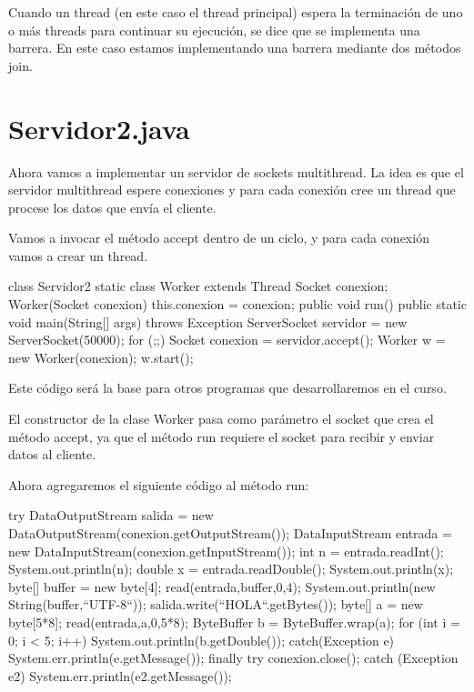 Cuando un thread (en este caso el thread principal) espera la terminación de uno o más threads para continuar su ejecución, se dice que se implementa una barrera. En este caso estamos implementando una barrera mediante dos métodos join.

\section{Servidor2.java}

Ahora vamos a implementar un servidor de sockets multithread.
La idea es que el servidor multithread espere conexiones y para cada conexión cree un thread que procese los datos que envía el cliente.

Vamos a invocar el método accept dentro de un ciclo, y para cada conexión vamos a crear un thread.

\begin{SourceCode}
class Servidor2
{
  static class Worker extends Thread
  {
    Socket conexion;
    Worker(Socket conexion)
    {
      this.conexion = conexion;
    }
    public void run()
    {
    }
  }
  public static void main(String[] args) throws Exception
  {
    ServerSocket servidor = new ServerSocket(50000);
    for (;;)
    {
      Socket conexion = servidor.accept();
      Worker w = new Worker(conexion);
      w.start();
    }
  }
}
\end{SourceCode}

Este código será la base para otros programas que desarrollaremos en el curso.

El constructor de la clase Worker pasa como parámetro el socket que crea el método accept, ya que el método run requiere el socket para recibir y enviar datos al cliente.

Ahora agregaremos el siguiente código al método run:

\begin{SourceCode}
try
{
  DataOutputStream salida = new DataOutputStream(conexion.getOutputStream());
  DataInputStream entrada = new DataInputStream(conexion.getInputStream());
  int n = entrada.readInt();
  System.out.println(n);
  double x = entrada.readDouble();
  System.out.println(x);
  byte[] buffer = new byte[4];
  read(entrada,buffer,0,4);
  System.out.println(new String(buffer,``UTF-8``));
  salida.write(``HOLA``.getBytes());
  byte[] a = new byte[5*8];
  read(entrada,a,0,5*8);
  ByteBuffer b = ByteBuffer.wrap(a);
  for (int i = 0; i < 5; i++) System.out.println(b.getDouble());
}
catch(Exception e)
{
  System.err.println(e.getMessage());
}
finally
{
  try
  {
    conexion.close();
  }
  catch (Exception e2)
  {
    System.err.println(e2.getMessage());
  }
}
\end{SourceCode}

